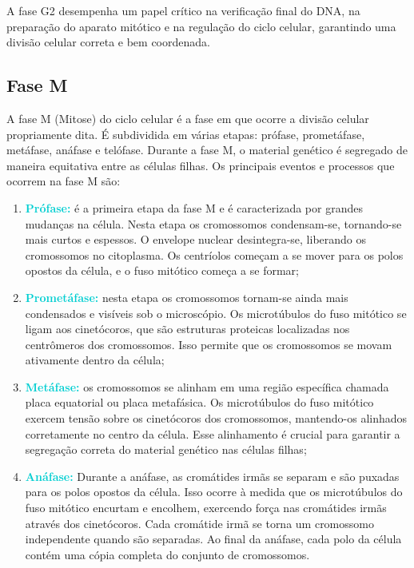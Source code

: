 \documentclass[11pt,a4paper]{article}
\begin{document}
	A fase G2 desempenha um papel crítico na verificação final do DNA, na preparação do aparato mitótico e na regulação do ciclo celular, garantindo uma divisão celular correta e bem coordenada.

	\subsection{Fase M}

	A fase M (Mitose) do ciclo celular é a fase em que ocorre a divisão celular propriamente dita. É subdividida em várias etapas: prófase, prometáfase, metáfase, anáfase e telófase. Durante a fase M, o material genético é segregado de maneira equitativa entre as células filhas. Os principais eventos e processos que ocorrem na fase M são:

	\begin{enumerate}
		\item \textcolor{DarkTurquoise}{\textbf{Prófase:}} é a primeira etapa da fase M e é caracterizada por grandes mudanças na célula. Nesta etapa os cromossomos condensam-se, tornando-se mais curtos e espessos. O envelope nuclear desintegra-se, liberando os cromossomos no citoplasma. Os centríolos começam a se mover para os polos opostos da célula, e o fuso mitótico começa a se formar;
		\item \textcolor{DarkTurquoise}{\textbf{Prometáfase:}} nesta etapa os cromossomos tornam-se ainda mais condensados e visíveis sob o microscópio. Os microtúbulos do fuso mitótico se ligam aos cinetócoros, que são estruturas proteicas localizadas nos centrômeros dos cromossomos. Isso permite que os cromossomos se movam ativamente dentro da célula;
		\item \textcolor{DarkTurquoise}{\textbf{Metáfase:}} os cromossomos se alinham em uma região específica chamada placa equatorial ou placa metafásica. Os microtúbulos do fuso mitótico exercem tensão sobre os cinetócoros dos cromossomos, mantendo-os alinhados corretamente no centro da célula. Esse alinhamento é crucial para garantir a segregação correta do material genético nas células filhas;
		\item \textcolor{DarkTurquoise}{\textbf{Anáfase:}} Durante a anáfase, as cromátides irmãs se separam e são puxadas para os polos opostos da célula. Isso ocorre à medida que os microtúbulos do fuso mitótico encurtam e encolhem, exercendo força nas cromátides irmãs através dos cinetócoros. Cada cromátide irmã se torna um cromossomo independente quando são separadas. Ao final da anáfase, cada polo da célula contém uma cópia completa do conjunto de cromossomos.

\end{enumerate}
\end{document}
